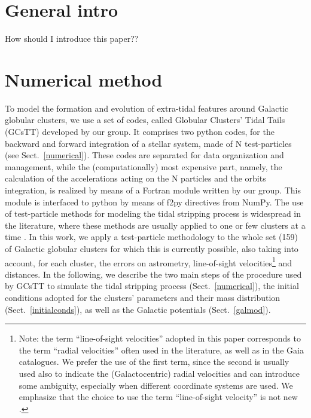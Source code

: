 \section{General intro}

How should I introduce this paper??

\section{\bf{Numerical method}}\label{methods}

    To model the formation and evolution of extra-tidal features around Galactic globular clusters, we use a set of codes, called Globular Clusters' Tidal Tails (GCsTT)  developed by our group. It comprises two python codes, for the backward and forward integration of a stellar system, made of N test-particles (see Sect.~\ref{numerical}). These codes are separated for data organization and management, while the (computationally) most expensive part, namely, the calculation of the accelerations acting on the N particles and the orbits integration, is realized by means of a Fortran module written by our group. This module is interfaced to python by means of f2py directives from NumPy. The use of test-particle methods for modeling the tidal stripping process is widespread in the literature, where these methods are  usually applied to one or few clusters at a time \citep[see, e.g., ][]{2012MNRAS.423.2845L, 2012A&A...546L...7M, 2019MNRAS.488.1535P, 2021MNRAS.505.3033P, 2022ApJ...929...89G}. In this work, we apply a test-particle methodology to the whole set (159) of Galactic globular clusters for which this is currently possible, also taking into account, for each cluster, the errors on astrometry, line-of-sight velocities\footnote{Note: the term ``line-of-sight velocities''  adopted in this paper corresponds to the term ``radial velocities'' often used in the literature, as well as in the Gaia catalogues. We prefer the use of the first term, since the second is usually used also to indicate the (Galactocentric) radial velocities and can introduce some ambiguity, especially when different coordinate systems are used. We emphasize that the choice to use the term ``line-of-sight velocity'' is not new \citep[see, e.g., ][]{2021MNRAS.505.5978V}.} and distances. In the following, we describe the two main steps of the procedure used by GCsTT  to simulate the tidal stripping process (Sect.~\ref{numerical}), the initial conditions adopted for the clusters' parameters and their mass distribution (Sect.~\ref{initialconds}), as well as the Galactic potentials (Sect.~\ref{galmod}).
